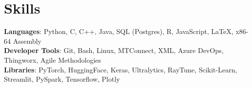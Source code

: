 \documentclass[letterpaper,11pt]{article}
\begin{document}
%
\section{Skills}
 \begin{itemize}[leftmargin=0.15in, label={}]
    \small{\item{
     \textbf{Languages}{: Python, C, C++, Java, SQL (Postgres), R, JavaScript, LaTeX, x86-64 Assembly} \\
     \textbf{Developer Tools}{: Git, Bash, Linux, MTConnect, XML, Azure DevOps, Thingworx, Agile Methodologies} \\
     \textbf{Libraries}{: PyTorch, HuggingFace, Keras, Ultralytics, RayTune, Scikit-Learn, Streamlit, PySpark, Tensorflow, Plotly} \\
    }}
 \end{itemize}


\end{document}
